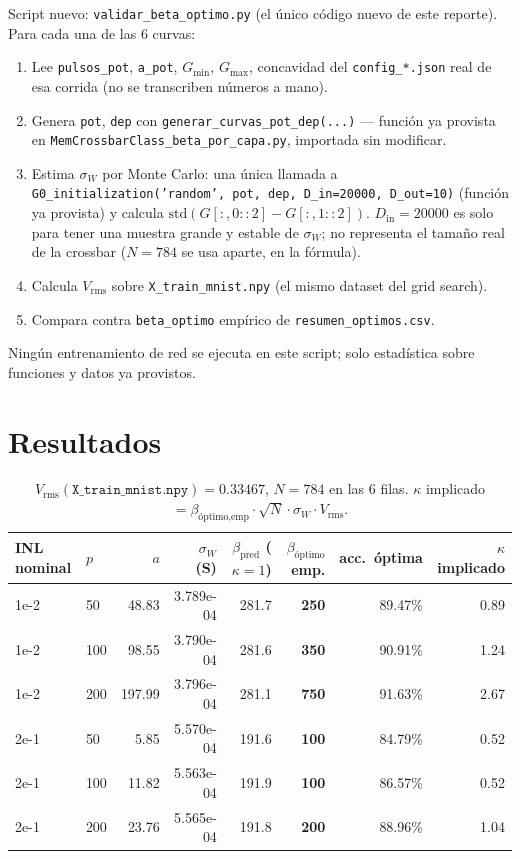 \documentclass[11pt]{article}
\begin{document}
Script nuevo: \texttt{validar\_beta\_optimo.py} (el único código nuevo de
este reporte). Para cada una de las 6 curvas:
\begin{enumerate}
\item Lee \texttt{pulsos\_pot}, \texttt{a\_pot}, $G_{\min}$, $G_{\max}$,
  concavidad del \texttt{config\_*.json} real de esa corrida (no se
  transcriben números a mano).
\item Genera \texttt{pot}, \texttt{dep} con
  \texttt{generar\_curvas\_pot\_dep(...)} --- función ya provista en
  \texttt{MemCrossbarClass\_beta\_por\_capa.py}, importada sin modificar.
\item Estima $\sigma_W$ por Monte Carlo: una única llamada a
  \texttt{G0\_initialization('random', pot, dep, D\_in=20000, D\_out=10)}
  (función ya provista) y calcula $\mathrm{std}(G[{:},0{::}2]-G[{:},1{::}2])$.
  $D_{\mathrm{in}}=20000$ es solo para tener una muestra grande y estable de
  $\sigma_W$; no representa el tamaño real de la crossbar ($N=784$ se usa
  aparte, en la fórmula).
\item Calcula $V_{\mathrm{rms}}$ sobre \texttt{X\_train\_mnist.npy} (el
  mismo dataset del grid search).
\item Compara contra \texttt{beta\_optimo} empírico de
  \texttt{resumen\_optimos.csv}.
\end{enumerate}
Ningún entrenamiento de red se ejecuta en este script; solo estadística
sobre funciones y datos ya provistos.

\section{Resultados}

\begin{table}[htbp]
\centering
\small
\begin{tabular}{@{}llrrrrrr@{}}
\toprule
INL nominal & $p$ & $a$ & $\sigma_W$ (S) & $\beta_{\mathrm{pred}}$ ($\kappa{=}1$) & $\beta_{\text{óptimo}}$ emp. & acc.\ óptima & $\kappa$ implicado \\
\midrule
1e-2 & 50  & 48.83  & 3.789e-04 & 281.7 & \textbf{250} & 89.47\% & 0.89 \\
1e-2 & 100 & 98.55  & 3.790e-04 & 281.6 & \textbf{350} & 90.91\% & 1.24 \\
1e-2 & 200 & 197.99 & 3.796e-04 & 281.1 & \textbf{750} & 91.63\% & 2.67 \\
2e-1 & 50  & 5.85   & 5.570e-04 & 191.6 & \textbf{100} & 84.79\% & 0.52 \\
2e-1 & 100 & 11.82  & 5.563e-04 & 191.9 & \textbf{100} & 86.57\% & 0.52 \\
2e-1 & 200 & 23.76  & 5.565e-04 & 191.8 & \textbf{200} & 88.96\% & 1.04 \\
\bottomrule
\end{tabular}
\caption{$V_{\mathrm{rms}}(\texttt{X\_train\_mnist.npy})=0.33467$, $N=784$
en las 6 filas. $\kappa$ implicado $=\beta_{\text{óptimo,emp}}\cdot\sqrt{N}\cdot\sigma_W\cdot V_{\mathrm{rms}}$.}
\end{table}
\end{document}
